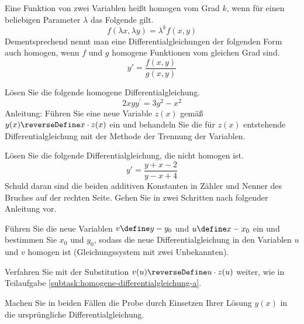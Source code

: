 \begin{atiTask}[
	topic = Gewöhnliche Differentialgleichungen,
	subtopic = Separable Differentialgleichungen,
	title = Homogene Differentialgleichungen,
	language = Deutsch
]
	Eine Funktion von zwei Variablen heißt homogen vom Grad $k$, wenn für einen beliebigen Parameter $\lambda$ das Folgende gilt.
	\[
		f(\lambda x, \lambda y) = \lambda^k f(x,y)
	\]
	Dementsprechend nennt man eine Differentialgleichungen der folgenden Form auch homogen, wenn $f$ und $g$ homogene Funktionen vom gleichen Grad sind.
	\[
		y' = \frac{f(x,y)}{g(x,y)}
	\]

	\begin{atiSubtasks}
		\item{
		\label{subtask:homogene-differentialgleichung-a}
			Lösen Sie die folgende homogene Differentialgleichung.
			\[
				2xyy^\prime = 3y^2 - x^2
			\]
			Anleitung: Führen Sie eine neue Variable $z(x)$ gemäß $y(x)\reverseDefine x\cdot z(x)$ ein und behandeln Sie die für $z(x)$ entstehende Differentialgleichung mit der Methode der Trennung der Variablen.
		}
		\item{
			Lösen Sie die folgende Differentialgleichung, die nicht homogen ist.
			\[
				y' = \frac{y+x-2}{y-x+4}
			\]
			Schuld daran sind die beiden additiven Konstanten in Zähler und Nenner des Bruches auf der rechten Seite.
			Gehen Sie in zwei Schritten nach folgender Anleitung vor.
			\begin{atiItems}
				\item Führen Sie die neue Variablen $v\define y-y_0$ und $u\define x-x_0$ ein und bestimmen Sie $x_0$ und $y_0$, sodass die neue Differentialgleichung in den Variablen $u$ und $v$ homogen ist (Gleichungssystem mit zwei Unbekannten).

				\item Verfahren Sie mit der Substitution $v(u)\reverseDefine u\cdot z(u)$ weiter, wie in Teilaufgabe \ref{subtask:homogene-differentialgleichung-a}.
			\end{atiItems}
		}
		\item{
			Machen Sie in beiden Fällen die Probe durch Einsetzen Ihrer Lösung $y(x)$ in die ursprüngliche Differentialgleichung.
		}
	\end{atiSubtasks}
\end{atiTask}